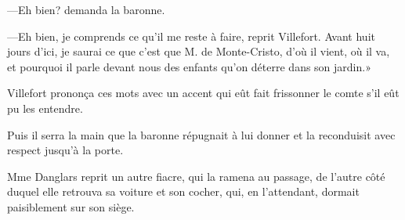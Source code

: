 —Eh bien? demanda la baronne. 

—Eh bien, je comprends ce qu'il me reste à faire, reprit Villefort. Avant huit jours d'ici, je saurai ce que c'est que M. de Monte-Cristo, d'où il vient, où il va, et pourquoi il parle devant nous des enfants qu'on déterre dans son jardin.» 

Villefort prononça ces mots avec un accent qui eût fait frissonner le comte s'il eût pu les entendre. 

Puis il serra la main que la baronne répugnait à lui donner et la reconduisit avec respect jusqu'à la porte. 

Mme Danglars reprit un autre fiacre, qui la ramena au passage, de l'autre côté duquel elle retrouva sa voiture et son cocher, qui, en l'attendant, dormait paisiblement sur son siège. 
